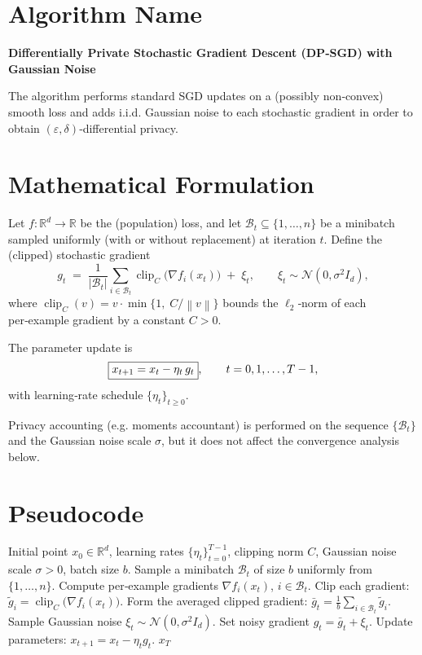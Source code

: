 \documentclass{article}
\newcommand{\R}{\mathbb{R}}
\newcommand{\norm}[1]{\left\|#1\right\|}
\begin{document}
\section*{Algorithm Name}
\textbf{Differentially Private Stochastic Gradient Descent (DP‑SGD) with Gaussian Noise}  

The algorithm performs standard SGD updates on a (possibly non‑convex) smooth loss
and adds i.i.d. Gaussian noise to each stochastic gradient in order to obtain
$(\varepsilon,\delta)$‑differential privacy.

\section*{Mathematical Formulation}
Let $f:\R^{d}\to\R$ be the (population) loss, and let $\mathcal{B}_{t}\subseteq\{1,\dots,n\}$ be a minibatch
sampled uniformly (with or without replacement) at iteration $t$.
Define the (clipped) stochastic gradient
\[
g_{t}
\;=\;
\frac{1}{|\mathcal{B}_{t}|}\sum_{i\in\mathcal{B}_{t}}
\operatorname{clip}_{C}\!\big(\nabla f_{i}(x_{t})\big)
\;+\;
\xi_{t},
\qquad 
\xi_{t}\sim\mathcal{N}(0,\sigma^{2}I_{d}),
\]
where $\operatorname{clip}_{C}(v)=v\cdot\min\!\big\{1,\;C/\norm{v}\big\}$ bounds the $\ell_{2}$‑norm of each per‑example
gradient by a constant $C>0$.

The parameter update is
\[
\boxed{%
x_{t+1}=x_{t}-\eta_{t}\,g_{t}}, \qquad t=0,1,\dots,T-1,
\]
with learning‑rate schedule $\{\eta_{t}\}_{t\ge0}$.

Privacy accounting (e.g. moments accountant) is performed on the sequence
$\{\mathcal{B}_{t}\}$ and the Gaussian noise scale $\sigma$, but it does not affect the
convergence analysis below.

\section*{Pseudocode}
\begin{algorithm}[H]
\caption{DP‑SGD with Gaussian Noise}
\begin{algorithmic}[1]
\REQUIRE Initial point $x_{0}\in\R^{d}$, learning rates $\{\eta_{t}\}_{t=0}^{T-1}$,
        clipping norm $C$, Gaussian noise scale $\sigma>0$, batch size $b$.
    \STATE Sample a minibatch $\mathcal{B}_{t}$ of size $b$ uniformly from $\{1,\dots,n\}$.
    \STATE Compute per‑example gradients $\nabla f_{i}(x_{t})$, $i\in\mathcal{B}_{t}$.
    \STATE Clip each gradient:
          $\tilde g_{i}= \operatorname{clip}_{C}\!\big(\nabla f_{i}(x_{t})\big)$.
    \STATE Form the averaged clipped gradient:
          $\bar g_{t}= \frac{1}{b}\sum_{i\in\mathcal{B}_{t}}\tilde g_{i}$.
    \STATE Sample Gaussian noise $\xi_{t}\sim\mathcal{N}(0,\sigma^{2}I_{d})$.
    \STATE Set noisy gradient $g_{t}= \bar g_{t}+ \xi_{t}$.
    \STATE Update parameters: $x_{t+1}=x_{t}-\eta_{t}g_{t}$.
\ENDFOR
\RETURN $x_{T}$
\end{algorithmic}
\end{algorithm}
\end{document}
